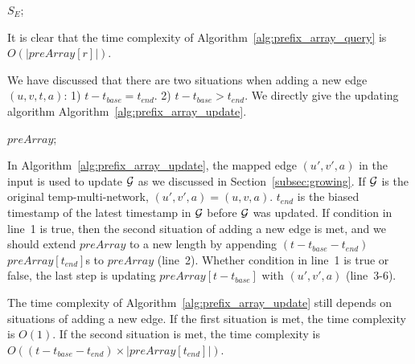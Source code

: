 \documentclass[10pt,journal,compsoc]{IEEEtran}
\begin{document}
{\begin{algorithm}[t]
	\Return $ S_E $;
\end{algorithm}
It is clear that the time complexity of Algorithm~\ref{alg:prefix_array_query} is $ O(|preArray[r]|) $.

 We have discussed that there are two situations when adding a new edge $ (u,v,t,a) $: 1) $ t-t_{base}=t_{end} $. 2) $ t-t_{base}>t_{end} $. We directly give the updating algorithm Algorithm~\ref{alg:prefix_array_update}.
\begin{algorithm}[t]
	\scriptsize
	\caption{$\kw{Prefix Array Update}$}
	\label{alg:prefix_array_update}
	\Return $ preArray $;
\end{algorithm}

In Algorithm~\ref{alg:prefix_array_update}, the mapped edge $ (u',v',a) $ in the input is used to update $ \mathcal{G} $ as we discussed in Section~\ref{subsec:growing}. If $ \mathcal{G} $ is the original temp-multi-network, $ (u',v',a)=(u,v,a) $. $ t_{end} $ is the biased timestamp of the latest timestamp in $ \mathcal{G} $ before $ \mathcal{G} $ was updated. If condition in line~1 is true, then the second situation of adding a new edge is met, and we should extend $ preArray $ to a new length by appending $ (t-t_{base}-t_{end}) $ $ preArray[t_{end}] $s to $ preArray $ (line~2). Whether condition in line~1 is true or false, the last step is updating $ preArray[t-t_{base}] $ with $ (u',v',a) $ (line~3-6).

The time complexity of Algorithm~\ref{alg:prefix_array_update} still depends on situations of adding a new edge. If the first situation is met, the time complexity is $ O(1) $. If the second situation is met, the time complexity is $ O((t-t_{base}-t_{end})\times |preArray[t_{end}]|) $.
}
\end{document}
